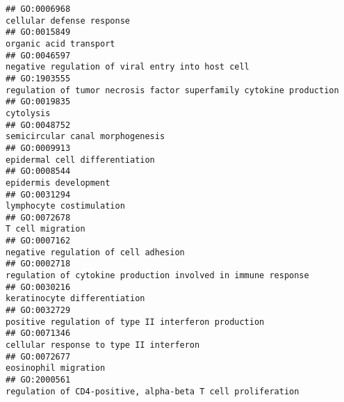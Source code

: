 \documentclass[
]{article}
\begin{document}
\begin{verbatim}
## GO:0006968                                                                                                                        cellular defense response
## GO:0015849                                                                                                                           organic acid transport
## GO:0046597                                                                                                negative regulation of viral entry into host cell
## GO:1903555                                                                              regulation of tumor necrosis factor superfamily cytokine production
## GO:0019835                                                                                                                                        cytolysis
## GO:0048752                                                                                                                 semicircular canal morphogenesis
## GO:0009913                                                                                                                   epidermal cell differentiation
## GO:0008544                                                                                                                            epidermis development
## GO:0031294                                                                                                                         lymphocyte costimulation
## GO:0072678                                                                                                                                 T cell migration
## GO:0007162                                                                                                             negative regulation of cell adhesion
## GO:0002718                                                                                    regulation of cytokine production involved in immune response
## GO:0030216                                                                                                                     keratinocyte differentiation
## GO:0032729                                                                                             positive regulation of type II interferon production
## GO:0071346                                                                                                          cellular response to type II interferon
## GO:0072677                                                                                                                             eosinophil migration
## GO:2000561                                                                                      regulation of CD4-positive, alpha-beta T cell proliferation

\end{verbatim}
\end{document}
